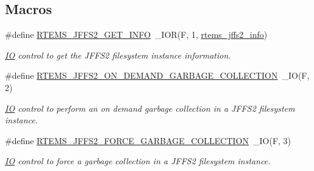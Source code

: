 \subsection*{Macros}
\begin{DoxyCompactItemize}
\item 
\#define \mbox{\hyperlink{group__JFFS2_ga9069cf243a2d497d065c41ef3c735783}{R\+T\+E\+M\+S\+\_\+\+J\+F\+F\+S2\+\_\+\+G\+E\+T\+\_\+\+I\+N\+FO}}~\+\_\+\+I\+OR(\textquotesingle{}F\textquotesingle{}, 1, \mbox{\hyperlink{structrtems__jffs2__info}{rtems\+\_\+jffs2\+\_\+info}})
\begin{DoxyCompactList}\small\item\em \mbox{\hyperlink{structIO}{IO}} control to get the J\+F\+F\+S2 filesystem instance information. \end{DoxyCompactList}\item 
\#define \mbox{\hyperlink{group__JFFS2_ga67c3e575d73069c20422e38ecdee1006}{R\+T\+E\+M\+S\+\_\+\+J\+F\+F\+S2\+\_\+\+O\+N\+\_\+\+D\+E\+M\+A\+N\+D\+\_\+\+G\+A\+R\+B\+A\+G\+E\+\_\+\+C\+O\+L\+L\+E\+C\+T\+I\+ON}}~\+\_\+\+IO(\textquotesingle{}F\textquotesingle{}, 2)
\begin{DoxyCompactList}\small\item\em \mbox{\hyperlink{structIO}{IO}} control to perform an on demand garbage collection in a J\+F\+F\+S2 filesystem instance. \end{DoxyCompactList}\item 
\#define \mbox{\hyperlink{group__JFFS2_ga3bbcee8a5af837fa3780d95cd45aa59b}{R\+T\+E\+M\+S\+\_\+\+J\+F\+F\+S2\+\_\+\+F\+O\+R\+C\+E\+\_\+\+G\+A\+R\+B\+A\+G\+E\+\_\+\+C\+O\+L\+L\+E\+C\+T\+I\+ON}}~\+\_\+\+IO(\textquotesingle{}F\textquotesingle{}, 3)
\begin{DoxyCompactList}\small\item\em \mbox{\hyperlink{structIO}{IO}} control to force a garbage collection in a J\+F\+F\+S2 filesystem instance. \end{DoxyCompactList}\end{DoxyCompactItemize}
